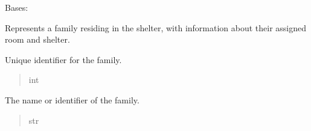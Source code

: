 \documentclass[letterpaper,10pt,english]{sphinxmanual}
\begin{document}
\begin{fulllineitems}
\label{\detokenize{app.models:app.models.family.Family}}
\pysigstartsignatures
\pysiglinewithargsret
{}
{\sphinxparamcomma {}\sphinxparamcomma {}\sphinxparamcomma {}\sphinxparamcomma {}\sphinxparamcomma {}\sphinxparamcomma {}}
{}
\pysigstopsignatures
\sphinxAtStartPar
Bases: 

\sphinxAtStartPar
Represents a family residing in the shelter, with information about
their assigned room and shelter.

\begin{fulllineitems}
\label{\detokenize{app.models:app.models.family.Family.idFamily}}
\pysigstartsignatures
\pysigline
{}
\pysigstopsignatures
\sphinxAtStartPar
Unique identifier for the family.
\begin{quote}\begin{description}
\sphinxAtStartPar
int

\end{description}\end{quote}

\end{fulllineitems}


\begin{fulllineitems}
\label{\detokenize{app.models:app.models.family.Family.familyName}}
\pysigstartsignatures
\pysigline
{}
\pysigstopsignatures
\sphinxAtStartPar
The name or identifier of the family.
\begin{quote}\begin{description}
\sphinxAtStartPar
str


\end{description}
\end{quote}
\end{fulllineitems}
\end{fulllineitems}
\end{document}
